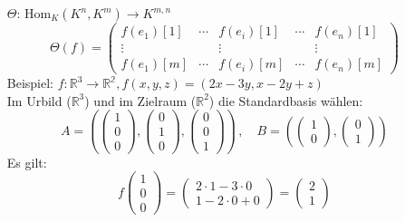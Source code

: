 \begin{itemize}\itemsep0em
	\item [$\Theta$:] Hom$_K(K^n, K^m) \to K^{m,n}$
	\begin{equation*}
		\Theta (f) =   
		\begin{pmatrix}
   f(e_1)[1] & \cdots & f(e_i)[1] & \cdots & f(e_n)[1] \\
	\vdots & & \vdots & & \vdots\\
	f(e_1)[m] & \cdots & f(e_i)[m] & \cdots & f(e_n)[m]
		\end{pmatrix}
	\end{equation*}
	Beispiel: $f: \mathbb{R}^3 \to \mathbb{R^2}, f(x, y, z) = (2x - 3y, x - 2y + z)$\\
	Im Urbild ($\mathbb{R}^3$) und im Zielraum ($\mathbb{R}^2$) die Standardbasis wählen:
	\begin{equation*}
	A=\left(
		\begin{pmatrix} 1\\ 0\\ 0\end{pmatrix}, \begin{pmatrix} 0\\ 1\\ 0\end{pmatrix}, \begin{pmatrix} 0\\ 0\\ 1\end{pmatrix} \right) 
		\, , \quad
	B=\left(
		\begin{pmatrix} 1\\ 0\end{pmatrix}, \begin{pmatrix} 0\\ 1\end{pmatrix}
		\right) 
	\end{equation*}
	Es gilt:
	\begin{equation*}
		f\begin{pmatrix} 1\\0\\0\end{pmatrix} = 
		\begin{pmatrix}
			2 \cdot 1 - 3 \cdot 0\\
			1 - 2 \cdot 0 + 0
		\end{pmatrix}
		= \begin{pmatrix}2\\1\end{pmatrix}
	\end{equation*}

\end{itemize}
